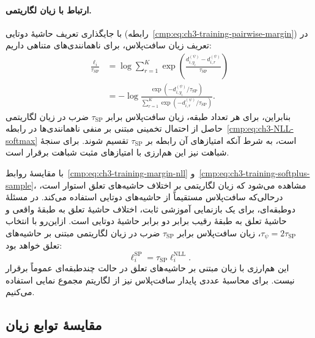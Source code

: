\paragraph{ارتباط با زیان لگاریتمی.}
با جایگذاری تعریف حاشیهٔ دوتایی
(رابطه~\eqref{cmp:eq:ch3-training-pairwise-margin})
در تعریف زیان سافت‌پلاس، برای ناهمانندی‌های
متناهی داریم:
\begin{equation}\label{cmp:eq:ch3-training-softplus-distance-nll}
\boxed{\begin{aligned}
\frac{\ell_i}{\tau_{\mathrm{SP}}}
&=\log\sum_{r=1}^{K}
\exp\left(\frac{d_{i,y_i}^{(\psi)}-d_{i,r}^{(\psi)}}
{\tau_{\mathrm{SP}}}\right)\\
&=-\log\frac{\exp(-d_{i,y_i}^{(\psi)}/\tau_{\mathrm{SP}})}
{\sum_{r=1}^{K}\exp(-d_{i,r}^{(\psi)}/\tau_{\mathrm{SP}})}.
\end{aligned}}
\end{equation}
بنابراین، برای هر تعداد طبقه، زیان سافت‌پلاس
برابر $\tau_{\mathrm{SP}}$ ضرب در زیان لگاریتمی
حاصل از احتمال تخمینی مبتنی بر منفی ناهمانندی‌ها
در رابطه~\eqref{cmp:eq:ch3-NLL-softmax}
است، به شرط آنکه امتیازهای آن رابطه بر
$\tau_{\mathrm{SP}}$ تقسیم شوند.
برای سنجهٔ شباهت نیز این هم‌ارزی با امتیازهای
مثبت شباهت برقرار است.

با مقایسهٔ
روابط~\eqref{cmp:eq:ch3-training-margin-nll}
و~\eqref{cmp:eq:ch3-training-softplus-sample}،
مشاهده می‌شود که زیان لگاریتمی بر اختلاف
حاشیه‌های تعلق استوار است، درحالی‌که سافت‌پلاس
مستقیماً از حاشیه‌های دوتایی استفاده می‌کند.
در مسئلهٔ دوطبقه‌ای، برای یک بازنمایی آموزشی ثابت،
اختلاف حاشیهٔ تعلق به طبقهٔ واقعی و حاشیهٔ تعلق
به طبقهٔ رقیب برابر دو برابر حاشیهٔ دوتایی است.
ازاین‌رو با انتخاب
$\tau_\psi=2\tau_{\mathrm{SP}}$، زیان سافت‌پلاس
برابر $\tau_{\mathrm{SP}}$ ضرب در زیان لگاریتمی
مبتنی بر حاشیه‌های تعلق خواهد بود:
\[
\ell_i^{\mathrm{SP}}=\tau_{\mathrm{SP}}\ell_i^{\mathrm{NLL}}.
\]
این هم‌ارزی با زیان مبتنی بر حاشیه‌های تعلق در
حالت چندطبقه‌ای عموماً برقرار نیست.
برای محاسبهٔ عددی پایدار سافت‌پلاس نیز از
لگاریتم مجموع نمایی استفاده می‌کنیم.

\subsection{مقایسهٔ توابع زیان}
\label{cmp:subsec:ch3-training-loss-comparison}

